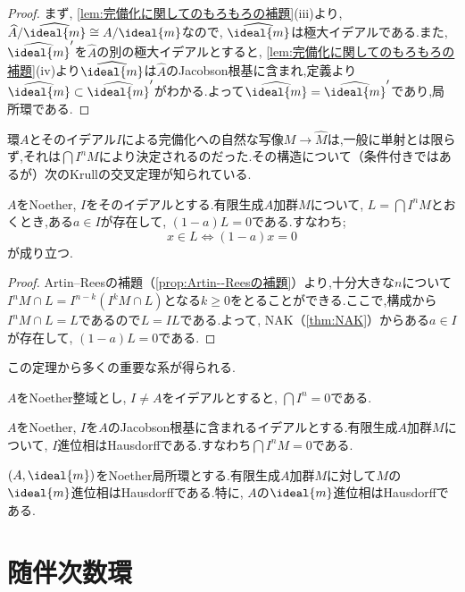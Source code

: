 \begin{proof}
	まず, \ref{lem:完備化に関してのもろもろの補題}(iii)より, $\widehat{A}/\widehat{\ideal{m}}\cong A/\ideal{m}$なので, $\widehat{\ideal{m}}$は極大イデアルである.また, $\widehat{\ideal{m}}'$を$\widehat{A}$の別の極大イデアルとすると, \ref{lem:完備化に関してのもろもろの補題}(iv)より$\widehat{\ideal{m}}$は$\widehat{A}$のJacobson根基に含まれ,定義より$\widehat{\ideal{m}}\subset\widehat{\ideal{m}}'$がわかる.よって$\widehat{\ideal{m}}=\widehat{\ideal{m}}'$であり,局所環である.
\end{proof}

環$A$とそのイデアル$I$による完備化への自然な写像$M\to\widehat{M}$は,一般に単射とは限らず,それは$\bigcap I^nM$により決定されるのだった.その構造について（条件付きではあるが）次のKrullの交叉定理が知られている.

\begin{thm}[Krullの交叉定理]
	$A$をNoether, $I$をそのイデアルとする.有限生成$A$加群$M$について, $L=\bigcap I^nM$とおくとき,ある$a\in I$が存在して, $(1-a)L=0$である.すなわち;
	\[x\in L\Longleftrightarrow (1-a)x=0\]
	が成り立つ.
\end{thm}

\begin{proof}
	Artin--Reesの補題（\ref{prop:Artin--Reesの補題}）より,十分大きな$n$について$I^n M\cap L=I^{n-k}(I^kM\cap L)$となる$k\geq0$をとることができる.ここで,構成から$I^n M\cap L=L$であるので$L=IL$である.よって, NAK（\ref{thm:NAK}）からある$a\in I$が存在して, $(1-a)L=0$である.
\end{proof}

この定理から多くの重要な系が得られる.

\begin{cor}
	$A$をNoether整域とし, $I\neq A$をイデアルとすると, $\bigcap I^n=0$である.
\end{cor}

\begin{cor}\label{cor:Krullの交叉定理の系}
	$A$をNoether, $I$を$A$のJacobson根基に含まれるイデアルとする.有限生成$A$加群$M$について, $I$進位相はHausdorffである.すなわち$\bigcap I^nM=0$である.
\end{cor}

\begin{cor}
	$(A,\ideal{m})$をNoether局所環とする.有限生成$A$加群$M$に対して$M$の$\ideal{m}$進位相はHausdorffである.特に, $A$の$\ideal{m}$進位相はHausdorffである.
\end{cor}
\section{随伴次数環}

